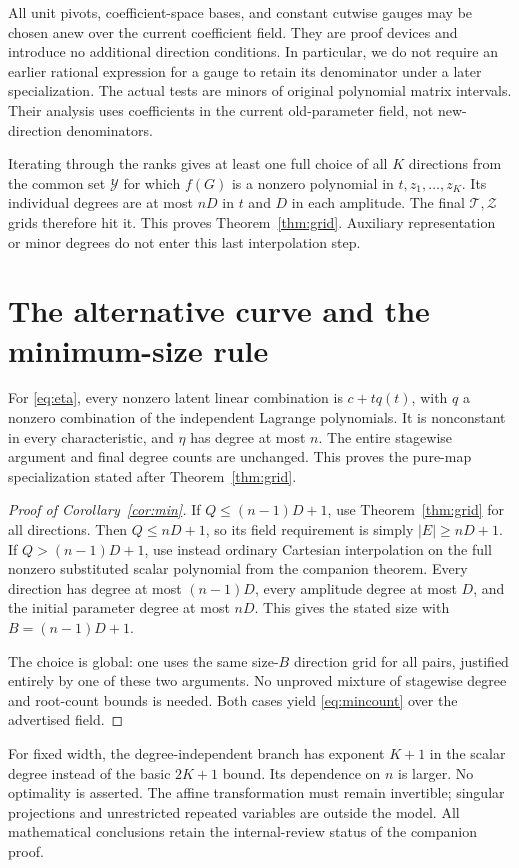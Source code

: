 All unit pivots, coefficient-space bases, and constant cutwise gauges
may be chosen anew over the current coefficient field. They are proof
devices and introduce no additional direction conditions. In particular,
we do not require an earlier rational expression for a gauge to
retain its denominator under a later specialization. The actual tests
are minors of original polynomial matrix intervals. Their analysis
uses coefficients in the current old-parameter field, not new-direction
denominators.

Iterating through the ranks gives at least one full choice of all $K$
directions from the common set $\mathcal Y$ for which $f(G)$ is a
nonzero polynomial in $t,z_1,\ldots,z_K$. Its individual degrees are
at most $nD$ in $t$ and $D$ in each amplitude. The final
$\mathcal T,\mathcal Z$ grids therefore hit it. This proves
Theorem~\ref{thm:grid}. Auxiliary representation or minor degrees do
not enter this last interpolation step.

\section{The alternative curve and the minimum-size rule}

For \eqref{eq:eta}, every nonzero latent linear combination is
$c+tq(t)$, with $q$ a nonzero combination of the independent Lagrange
polynomials. It is nonconstant in every characteristic, and $\eta$
has degree at most $n$. The entire stagewise argument and final
degree counts are unchanged. This proves the pure-map specialization
stated after Theorem~\ref{thm:grid}.

\begin{proof}[Proof of Corollary~\ref{cor:min}]
If $Q\le(n-1)D+1$, use Theorem~\ref{thm:grid} for all directions.
Then $Q\le nD+1$, so its field requirement is simply $|E|\ge nD+1$.
If $Q>(n-1)D+1$, use instead ordinary Cartesian interpolation on
the full nonzero substituted scalar polynomial from the companion
theorem. Every direction has degree at most $(n-1)D$, every amplitude
degree at most $D$, and the initial parameter degree at most $nD$.
This gives the stated size with $B=(n-1)D+1$.

The choice is global: one uses the same size-$B$ direction grid for
all pairs, justified entirely by one of these two arguments. No
unproved mixture of stagewise degree and root-count bounds is needed.
Both cases yield \eqref{eq:mincount} over the advertised field.
\end{proof}

For fixed width, the degree-independent branch has exponent $K+1$
in the scalar degree instead of the basic $2K+1$ bound. Its dependence
on $n$ is larger. No optimality is asserted. The affine transformation
must remain invertible; singular projections and unrestricted repeated
variables are outside the model. All mathematical conclusions retain
the internal-review status of the companion proof.


